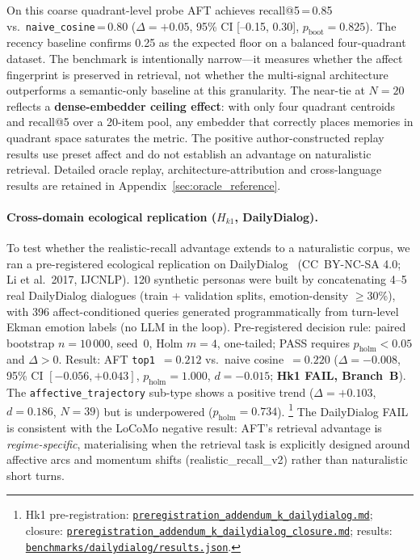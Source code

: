 \documentclass[11pt]{article}
\newcommand{\repourl}{https://github.com/gianlucamazza/emotional-memory}%
\begin{document}
On this coarse quadrant-level probe AFT achieves recall@5\,=\,0.85 vs.\
\texttt{naive\_cosine}\,=\,0.80 ($\Delta=+0.05$, 95\% CI [--0.15, 0.30],
$p_{\text{boot}}=0.825$).
The recency baseline confirms 0.25 as the expected floor on a balanced
four-quadrant dataset. The benchmark is intentionally narrow—it measures whether
the affect fingerprint is preserved in retrieval, not whether the multi-signal
architecture outperforms a semantic-only baseline at this granularity.
The near-tie at $N=20$ reflects a \textbf{dense-embedder ceiling effect}: with only
four quadrant centroids and recall@5 over a 20-item pool, any embedder that
correctly places memories in quadrant space saturates the metric.
The positive author-constructed replay results use preset affect and do not
establish an advantage on naturalistic retrieval. Detailed oracle replay,
architecture-attribution and cross-language results are retained in
Appendix~\ref{sec:oracle_reference}.

\paragraph{Cross-domain ecological replication ($H_{k1}$, DailyDialog).}
To test whether the realistic-recall advantage extends to a naturalistic corpus,
we ran a pre-registered ecological replication on DailyDialog~\citep{li2017dailydialog}
(CC~BY-NC-SA 4.0; Li et al.\ 2017, IJCNLP).
120 synthetic personas were built by concatenating 4--5 real DailyDialog dialogues
(train + validation splits, emotion-density $\geq$30\%),
with 396 affect-conditioned queries generated programmatically from turn-level
Ekman emotion labels (no LLM in the loop).
Pre-registered decision rule: paired bootstrap $n=10\,000$, seed~0, Holm $m=4$,
one-tailed; PASS requires $p_{\text{holm}}<0.05$ and $\Delta>0$.
Result: AFT \texttt{top1}~$=0.212$ vs.\ naive cosine~$=0.220$
($\Delta=-0.008$, 95\% CI $[-0.056,+0.043]$, $p_{\text{holm}}=1.000$, $d=-0.015$;
\textbf{Hk1 FAIL, Branch~B}).
The \texttt{affective\_trajectory} sub-type shows a positive trend
($\Delta=+0.103$, $d=0.186$, $N=39$) but is underpowered ($p_{\text{holm}}=0.734$).%
\footnote{Hk1 pre-registration:
\href{\repourl/blob/main/benchmarks/preregistration\_addendum\_k\_dailydialog.md}%
{\texttt{preregistration\_addendum\_k\_dailydialog.md}};
closure:
\href{\repourl/blob/main/benchmarks/preregistration\_addendum\_k\_dailydialog\_closure.md}%
{\texttt{preregistration\_addendum\_k\_dailydialog\_closure.md}};
results: \href{\repourl/blob/main/benchmarks/dailydialog/results.json}%
{\texttt{benchmarks/dailydialog/results.json}}.}
The DailyDialog FAIL is consistent with the LoCoMo negative result:
AFT's retrieval advantage is \emph{regime-specific}, materialising when the
retrieval task is explicitly designed around affective arcs and momentum shifts
(realistic\_recall\_v2) rather than naturalistic short turns.
\end{document}
